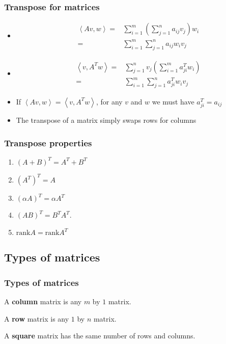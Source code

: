 \documentclass[compress]{beamer}
\newcommand{\iprod}[2]{\left\langle {#1} , {#2} \right\rangle}
\newcommand{\rank}{\mathrm{rank}}
\begin{document}
\begin{frame}
  \frametitle{Transpose for matrices}
  \begin{itemize}
  \item 
    \begin{align*}
      \iprod{Av}{w} = & \sum_{i=1}^m \left(\sum_{j=1}^n a_{ij} v_j \right)
      w_i  \\
      = & \sum_{i=1}^m \sum_{j=1}^n a_{ij} w_i v_j
    \end{align*}
  \item  
    \begin{align*}
      \iprod{v}{A^T w} = & \sum_{j=1}^n v_j \left(\sum_{i=1}^m a_{ji}^T
        w_i\right) \\
      = & \sum_{i=1}^m \sum_{j=1}^n a_{ji}^T w_i v_j
    \end{align*}
  \item If $\iprod{A v}{w} = \iprod{v}{A^T w} $, for any $v$ and $w$ we must
    have $a_{ji}^T = a_{ij}$
  \item The transpose of a matrix simply swaps rows
    for columns
  \end{itemize}
\end{frame}

\begin{frame}
  \frametitle{Transpose properties}
  \begin{enumerate}
  \item $(A+B)^T = A^T + B^T$
  \item $(A^T)^T = A$
  \item $(\alpha A)^T = \alpha A^T$
  \item $(AB)^T = B^T A^T$.
  \item $\rank A = \rank A^T$
  \end{enumerate}
\end{frame}

\subsection{Types of matrices}

\begin{frame}
  \frametitle{Types of matrices}
  \begin{definition}
    A \textbf{column} matrix is any $m$ by $1$ matrix.
  \end{definition}
  
  \begin{definition}
    A \textbf{row} matrix is any $1$ by $n$ matrix.
  \end{definition}
  
  \begin{definition}
    A \textbf{square} matrix has the same number of rows and columns.
  \end{definition}
\end{frame}
\end{document}
